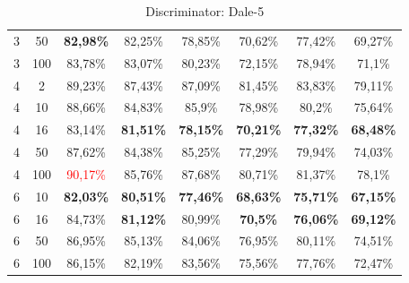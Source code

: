 \begin{table}[ht]
\begin{tabular}{cc|c|c|c|c|c|c}
        {3} & {50}  & \textbf{82,98\%}         & {82,25\%}                & {78,85\%}                & {70,62\%}                & {77,42\%}            & {69,27\%}            \\
        {3} & {100} & {83,78\%}                & {83,07\%}                & {80,23\%}                & {72,15\%}                & {78,94\%}            & {71,1\%}             \\
        {4} & {2}   & {89,23\%}                & {87,43\%}                & {87,09\%}                & {81,45\%}                & {83,83\%}            & {79,11\%}            \\
        {4} & {10}  & {88,66\%}                & {84,83\%}                & {85,9\%}                 & {78,98\%}                & {80,2\%}             & {75,64\%}            \\
        {4} & {16}  & {83,14\%}                & \textbf{81,51\%}         & \textbf{78,15\%}         & \textbf{70,21\%}         & \textbf{77,32\%}     & \textbf{68,48\%}     \\
        {4} & {50}  & {87,62\%}                & {84,38\%}                & {85,25\%}                & {77,29\%}                & {79,94\%}            & {74,03\%}            \\
        {4} & {100} & \textcolor{red}{90,17\%} & {85,76\%}                & {87,68\%}                & {80,71\%}                & {81,37\%}            & {78,1\%}             \\
        {6} & {10}  & \textbf{82,03\%}         & \textbf{80,51\%}         & \textbf{77,46\%}         & \textbf{68,63\%}         & \textbf{75,71\%}     & \textbf{67,15\%}     \\
        {6} & {16}  & {84,73\%}                & \textbf{81,12\%}         & {80,99\%}                & \textbf{70,5\%}          & \textbf{76,06\%}     & \textbf{69,12\%}     \\
        {6} & {50}  & {86,95\%}                & {85,13\%}                & {84,06\%}                & {76,95\%}                & {80,11\%}            & {74,51\%}            \\
        {6} & {100} & {86,15\%}                & {82,19\%}                & {83,56\%}                & {75,56\%}                & {77,76\%}            & {72,47\%}            \\
        \bottomrule
    \end{tabular}
    \caption{Discriminator: Dale-5}
    \label{tab:probing:discriminator:dale-5}
\end{table}

